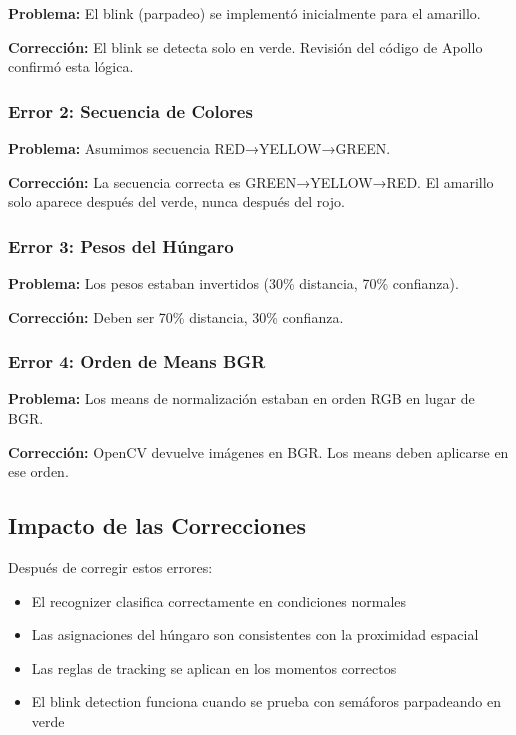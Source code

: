 \textbf{Problema:} El blink (parpadeo) se implementó inicialmente para el amarillo.

\textbf{Corrección:} El blink se detecta solo en verde. Revisión del código de Apollo confirmó esta lógica.

\subsubsection{Error 2: Secuencia de Colores}

\textbf{Problema:} Asumimos secuencia RED→YELLOW→GREEN.

\textbf{Corrección:} La secuencia correcta es GREEN→YELLOW→RED. El amarillo solo aparece después del verde, nunca después del rojo.

\subsubsection{Error 3: Pesos del Húngaro}

\textbf{Problema:} Los pesos estaban invertidos (30\% distancia, 70\% confianza).

\textbf{Corrección:} Deben ser 70\% distancia, 30\% confianza.

\subsubsection{Error 4: Orden de Means BGR}

\textbf{Problema:} Los means de normalización estaban en orden RGB en lugar de BGR.

\textbf{Corrección:} OpenCV devuelve imágenes en BGR. Los means deben aplicarse en ese orden.

\subsection{Impacto de las Correcciones}

Después de corregir estos errores:

\begin{itemize}
    \item El recognizer clasifica correctamente en condiciones normales
    \item Las asignaciones del húngaro son consistentes con la proximidad espacial
    \item Las reglas de tracking se aplican en los momentos correctos
    \item El blink detection funciona cuando se prueba con semáforos parpadeando en verde
\end{itemize}

